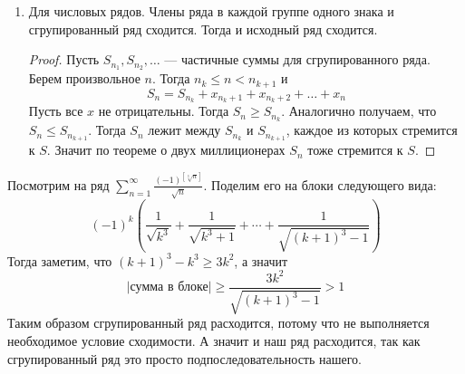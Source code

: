\begin{enumerate}
  \item Для числовых рядов. Члены ряда в каждой группе одного знака и сгрупированный ряд сходится. Тогда и исходный ряд сходится.
  \begin{proof}
    Пусть $S_{n_1}, S_{n_2}, \dotsc$ --- частичные суммы для сгрупированного ряда. Берем произвольное $n$. Тогда $n_k \leq n < n_{k + 1}$ и
    \begin{equation*}
      S_n = S_{n_k} + x_{n_{k}+1} + x_{n_{k}+2} + \dotsc + x_n
    \end{equation*}
    Пусть все $x$ не отрицательны. Тогда $S_n \geq S_{n_k}$. Аналогично получаем, что $S_n \leq S_{n_{k + 1}}$. Тогда $S_n$ лежит между $S_{n_k}$ и $S_{n_{k + 1}}$, каждое из которых стремится к $S$. Значит по теореме о двух миллиционерах $S_n$ тоже стремится к $S$.
  \end{proof}
\end{enumerate}

\begin{example}
  Посмотрим на ряд $\sum\limits_{n = 1}^{\infty} \frac{(-1)^{[\sqrt[3]{n}]}}{\sqrt{n}}$. Поделим его на блоки следующего вида:
  \begin{equation*}
    (-1)^k \left(
      \frac{1}{\sqrt{k^3}} + \frac{1}{\sqrt{k^3 + 1}} + \dotsb + \frac{1}{\sqrt{(k + 1)^3 - 1}}
    \right)
  \end{equation*}
  Тогда заметим, что $(k + 1)^3 - k^3 \geq 3k^2$, а значит
  \begin{equation*}
    |\text{сумма в блоке}|
    \geq
    \frac{3k^2}{\sqrt{(k + 1)^3 - 1}} > 1
  \end{equation*}
  Таким образом сгрупированный ряд расходится, потому что не выполняется необходимое условие сходимости. А значит и наш ряд расходится, так как сгрупированный ряд это просто подпоследовательность нашего.
\end{example}
